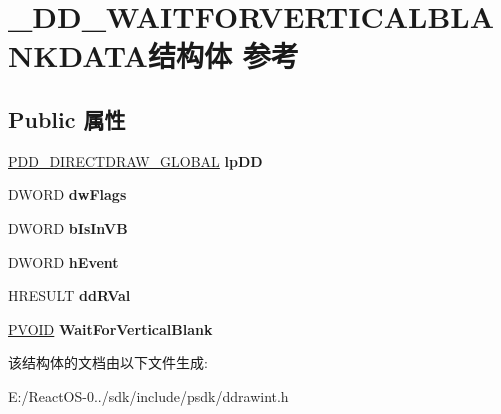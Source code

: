 \hypertarget{struct___d_d___w_a_i_t_f_o_r_v_e_r_t_i_c_a_l_b_l_a_n_k_d_a_t_a}{}\section{\+\_\+\+D\+D\+\_\+\+W\+A\+I\+T\+F\+O\+R\+V\+E\+R\+T\+I\+C\+A\+L\+B\+L\+A\+N\+K\+D\+A\+T\+A结构体 参考}
\label{struct___d_d___w_a_i_t_f_o_r_v_e_r_t_i_c_a_l_b_l_a_n_k_d_a_t_a}
\subsection*{Public 属性}
\begin{DoxyCompactItemize}
\item 
\mbox{\label{struct___d_d___w_a_i_t_f_o_r_v_e_r_t_i_c_a_l_b_l_a_n_k_d_a_t_a_abcfd9d17987cf83002338767eab95fb3}} 
\hyperlink{struct___d_d___d_i_r_e_c_t_d_r_a_w___g_l_o_b_a_l}{P\+D\+D\+\_\+\+D\+I\+R\+E\+C\+T\+D\+R\+A\+W\+\_\+\+G\+L\+O\+B\+AL} {\bfseries lp\+DD}
\item 
\mbox{\label{struct___d_d___w_a_i_t_f_o_r_v_e_r_t_i_c_a_l_b_l_a_n_k_d_a_t_a_a96150714e78310ca6d9394850365d2bf}} 
D\+W\+O\+RD {\bfseries dw\+Flags}
\item 
\mbox{\label{struct___d_d___w_a_i_t_f_o_r_v_e_r_t_i_c_a_l_b_l_a_n_k_d_a_t_a_ad0dbc53cd9606b2311b69d3aae484b55}} 
D\+W\+O\+RD {\bfseries b\+Is\+In\+VB}
\item 
\mbox{\label{struct___d_d___w_a_i_t_f_o_r_v_e_r_t_i_c_a_l_b_l_a_n_k_d_a_t_a_a6923b5292cf9203d3259fe7d2cd34708}} 
D\+W\+O\+RD {\bfseries h\+Event}
\item 
\mbox{\label{struct___d_d___w_a_i_t_f_o_r_v_e_r_t_i_c_a_l_b_l_a_n_k_d_a_t_a_a0b57cbe964b1fbbac9e67c668f6f6331}} 
H\+R\+E\+S\+U\+LT {\bfseries dd\+R\+Val}
\item 
\mbox{\label{struct___d_d___w_a_i_t_f_o_r_v_e_r_t_i_c_a_l_b_l_a_n_k_d_a_t_a_a411efb2dd7d6619f1f30c0c6fd4006db}} 
\hyperlink{interfacevoid}{P\+V\+O\+ID} {\bfseries Wait\+For\+Vertical\+Blank}
\end{DoxyCompactItemize}


该结构体的文档由以下文件生成\+:\begin{DoxyCompactItemize}
\item 
E\+:/\+React\+O\+S-\/0../sdk/include/psdk/ddrawint.\+h\end{DoxyCompactItemize}

